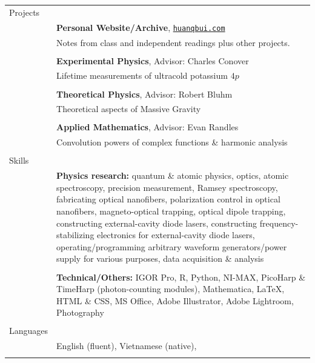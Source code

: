\documentclass[10pt]{article}
\begin{document}
\begin{longtable}{ l m{13.5cm}   }
  \large{Projects}		& \\ 
  						& \textbf{Personal Website/Archive}, \href{https://huanqbui.com}{\texttt{huanqbui.com}} \\
  						& Notes from class and independent readings plus other projects.\\
  						& \\
  
  						& \textbf{Experimental Physics}, Advisor: Charles Conover \\
  						& Lifetime measurements of ultracold potassium $4p$\\
  						& \\
  						 
  						& \textbf{Theoretical Physics}, Advisor: Robert Bluhm\\
  						& Theoretical aspects of Massive Gravity\\
  						& \\
  						 
  						& \textbf{Applied Mathematics}, Advisor: Evan Randles\\
  						& Convolution powers of complex functions \& harmonic analysis\\
  						& \\
  						 
  						 
  \large{Skills}      	& \\ 
  						& \textbf{Physics research:} quantum \& atomic physics, optics, atomic spectroscopy, precision measurement, Ramsey spectroscopy, fabricating optical nanofibers, polarization control in optical nanofibers, magneto-optical trapping, optical dipole trapping, constructing external-cavity diode lasers, constructing frequency-stabilizing electronics for external-cavity diode lasers, operating/programming arbitrary waveform generators/power supply for various purposes, data acquisition \& analysis \\
  						& \\
  						& \textbf{Technical/Others:} IGOR Pro, R, Python, NI-MAX, PicoHarp \& TimeHarp (photon-counting modules),  Mathematica, \LaTeX{}, HTML \& CSS, MS Office,  Adobe Illustrator, Adobe Lightroom, Photography \\ 
  						& \\
  						 
  				

  \large{Languages}     & \\
  						& English (fluent), Vietnamese (native), \\
						& \\
  						 

\end{longtable}
\end{document}
